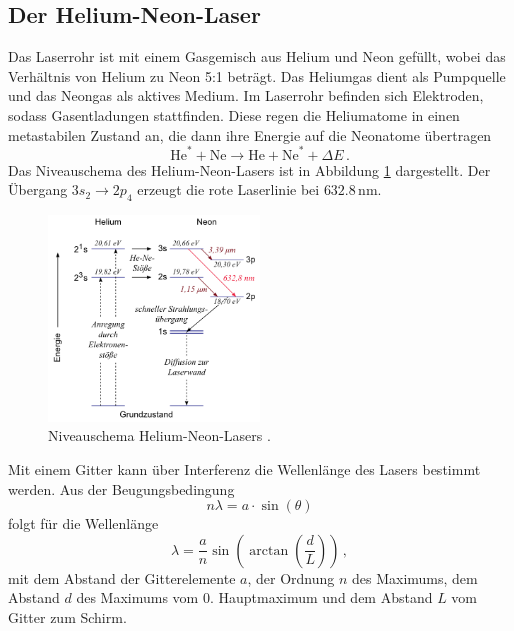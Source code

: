 \subsection*{Der Helium-Neon-Laser}
Das Laserrohr ist mit einem Gasgemisch aus Helium und Neon gefüllt, wobei das Verhältnis von Helium zu Neon 5:1 beträgt.
Das Heliumgas dient als Pumpquelle und das Neongas als aktives Medium. Im Laserrohr befinden sich Elektroden, sodass 
Gasentladungen stattfinden. Diese regen die Heliumatome in einen metastabilen Zustand an, die dann ihre Energie auf 
die Neonatome übertragen
\begin{equation*}
    \text{He}^{*} + \text{Ne} \rightarrow \text{He} + \text{Ne}^{*} + \Delta E \, .
\end{equation*}
Das Niveauschema des Helium-Neon-Lasers ist in Abbildung \ref{fig:tfig8} dargestellt.
Der Übergang $3s_2 \rightarrow 2p_4$ erzeugt die rote Laserlinie bei $632.8 \, \si{\nano\meter}$.
\FloatBarrier
    \begin{figure}[h]
    \centering
    \includegraphics[width=0.5\textwidth]{henelaser.png}
    \caption{Niveauschema Helium-Neon-Lasers \cite{quelle01}.}
    \label{fig:tfig8}
    \end{figure}
\FloatBarrier
\noindent
Mit einem Gitter kann über Interferenz die Wellenlänge des Lasers bestimmt werden. Aus der Beugungsbedingung 
\begin{equation*}
    n \lambda = a \cdot \sin \left(\theta \right)
\end{equation*}
folgt für die Wellenlänge
\begin{equation}
    \label{eq:Wellenlänge}
    \lambda = \frac{a}{n}  \sin \left(\arctan \left(\frac{d}{L}\right)\right)     \, ,
\end{equation}
mit dem Abstand der Gitterelemente $a$, der Ordnung $n$ des Maximums, dem Abstand $d$ des Maximums vom 0. Hauptmaximum
und dem Abstand $L$ vom Gitter zum Schirm.

